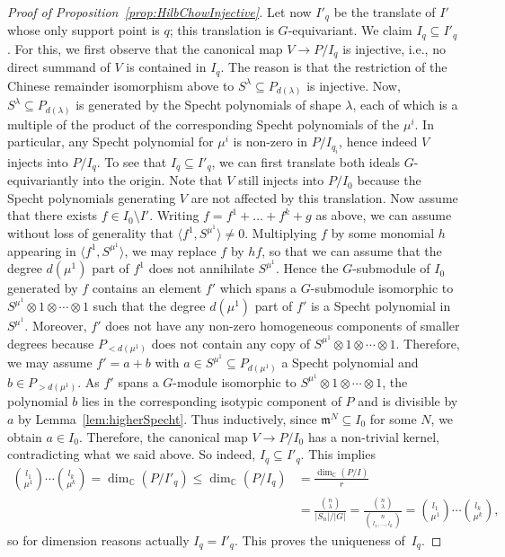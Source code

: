 \documentclass[11pt]{amsart}
\theoremstyle{definition}
\newcommand{\CC}{\mathbb{C}}
\newcommand{\mm}{\mathfrak{m}}
\begin{document}
\begin{proof}[Proof of Proposition~\ref{prop:HilbChowInjective}]
    Let now $I'_q$ be the translate of $I'$ whose only support point is $q$; this translation is $G$-equivariant. We claim $I_q \subseteq I'_q$. For this, we first observe that the canonical map $V \rightarrow P/I_q$ is injective, i.e., no direct summand of $V$ is contained in $I_q$. The reason is that the restriction of the Chinese remainder isomorphism above to $S^\lambda \subseteq P_{d(\lambda)}$ is injective. Now, $S^\lambda \subseteq P_{d(\lambda)}$ is generated by the Specht polynomials of shape $\lambda$, each of which is a multiple of the product of the corresponding Specht polynomials of the $\mu^i$. In particular, any Specht polynomial for $\mu^i$ is non-zero in $P/I_{q_i}$, hence indeed $V$ injects into $P/I_q$.
    To see that $I_q \subseteq I'_q$, we can first translate both ideals $G$-equivariantly into the origin. Note that $V$ still injects into $P/I_0$ because the Specht polynomials generating $V$ are not affected by this translation. Now assume that there exists $f \in I_0 \setminus I'$. Writing $f = f^1 + \ldots + f^k + g$ as above, we can assume without loss of generality that $\langle f^1, S^{\mu^1} \rangle \neq 0$. Multiplying $f$ by some monomial $h$ appearing in $\langle f^1, S^{\mu^1} \rangle$, we may replace $f$ by $hf$, so that we can assume that the degree $d(\mu^1)$ part of $f^1$ does not annihilate $S^{\mu^1}$. Hence the $G$-submodule of $I_0$ generated by $f$ contains an element $f'$ which spans a $G$-submodule isomorphic to $S^{\mu^1} \otimes 1 \otimes \cdots \otimes 1$ such that the degree $d(\mu^1)$ part of $f'$ is a Specht polynomial in $S^{\mu^1}$. Moreover, $f'$ does not have any non-zero homogeneous components of smaller degrees because $P_{<d(\mu^1)}$ does not contain any copy of $S^{\mu^1} \otimes 1 \otimes \cdots \otimes 1$. Therefore, we may assume $f' = a + b$ with $a \in S^{\mu^1} \subseteq P_{d(\mu^1)}$ a Specht polynomial and $b \in P_{>d(\mu^1)}$. As $f'$ spans a $G$-module isomorphic to $S^{\mu^1} \otimes 1 \otimes \cdots \otimes 1$, the polynomial $b$ lies in the corresponding isotypic component of $P$ and is divisible by $a$ by Lemma~\ref{lem:higherSpecht}. Thus inductively, since $\mm^N \subseteq I_0$ for some $N$, we obtain $a \in I_0$. Therefore, the canonical map $V \rightarrow P/I_0$ has a non-trivial kernel, contradicting what we said above. So indeed, $I_q \subseteq I'_q$. This implies
    \begin{align*}
        \binom{l_1}{\mu^1} \cdots \binom{l_k}{\mu^k} = \dim_\CC(P/I'_q) \leq \dim_\CC(P/I_q) &= \frac{\dim_\CC(P/I)}{r} \\ &= \frac{\binom{n}{\lambda}}{|S_n|/|G|} = \frac{\binom{n}{\lambda}}{\binom{n}{l_1,\ldots,l_k}} = \binom{l_1}{\mu^1} \cdots \binom{l_k}{\mu^k},
    \end{align*}
    so for dimension reasons actually $I_q = I'_q$. This proves the uniqueness of~$I_q$.
\end{proof}
\end{document}
